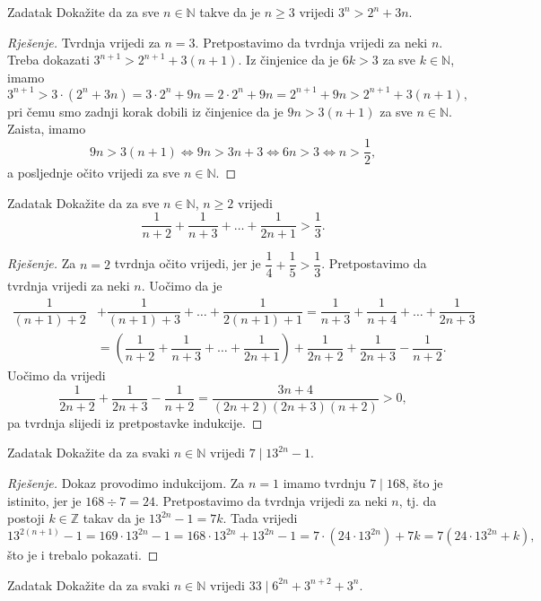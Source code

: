 \begin{exercise}{Zadatak}
Dokažite da za sve \(n\in \mathbb{N}\) takve da je \(n\geq 3\) vrijedi \(3^n>2^n+3n\).
\end{exercise}
\begin{proof}[Rješenje]
Tvrdnja vrijedi za \(n=3\). Pretpostavimo da tvrdnja vrijedi za neki \(n\). Treba dokazati \(3^{n+1}>2^{n+1}+3(n+1)\). Iz činjenice da je \(6k>3\) za sve \(k\in \mathbb{N}\), imamo
\[3^{n+1}>3\cdot (2^n+3n)=3\cdot 2^n+9n=2\cdot 2^n+9n=2^{n+1}+9n>2^{n+1}+3(n+1),\]
pri čemu smo zadnji korak dobili iz činjenice da je \(9n>3(n+1)\) za sve \(n\in \mathbb{N}\). Zaista, imamo
\[9n>3(n+1)\Leftrightarrow 9n>3n+3 \Leftrightarrow 6n>3 \Leftrightarrow n>\dfrac{1}{2},\]
a posljednje očito vrijedi za sve \(n\in \mathbb{N}\).
\end{proof}
\begin{exercise}{Zadatak}
Dokažite da za sve $n\in \mathbb{N}$, $n\geq 2$ vrijedi
$$\dfrac{1}{n+2}+\dfrac{1}{n+3}+\dots+\dfrac{1}{2n+1}>\dfrac{1}{3}.$$
\end{exercise}
\begin{proof}[Rješenje]
Za $n=2$ tvrdnja očito vrijedi, jer je $\dfrac{1}{4}+\dfrac{1}{5}>\dfrac{1}{3}$. Pretpostavimo da tvrdnja vrijedi za neki $n$. Uočimo da je
\begin{align*}
\dfrac{1}{(n+1)+2}&+\dfrac{1}{(n+1)+3}+\dots+\dfrac{1}{2(n+1)+1}=\dfrac{1}{n+3}+\dfrac{1}{n+4}+\dots+\dfrac{1}{2n+3}\\
&=\left(\dfrac{1}{n+2}+\dfrac{1}{n+3}+\dots+\dfrac{1}{2n+1}\right)+\dfrac{1}{2n+2}+\dfrac{1}{2n+3}-\dfrac{1}{n+2}.
\end{align*}
Uočimo da vrijedi
$$\dfrac{1}{2n+2}+\dfrac{1}{2n+3}-\dfrac{1}{n+2}=\dfrac{3n+4}{(2n+2)(2n+3)(n+2)}>0,$$
pa tvrdnja slijedi iz pretpostavke indukcije.
\end{proof}
\begin{exercise}{Zadatak}
Dokažite da za svaki \(n\in \mathbb{N}\) vrijedi \(7 \; |\; 13^{2n}-1\).
\end{exercise}
\begin{proof}[Rješenje]
Dokaz provodimo indukcijom. Za \(n=1\) imamo tvrdnju \(7 \; |\; 168\), što je istinito, jer je \(168 \div 7=24\). Pretpostavimo da tvrdnja vrijedi za neki \(n\), tj. da postoji \(k\in \mathbb{Z}\) takav da je \(13^{2n}-1=7k\). Tada vrijedi
\[13^{2(n+1)}-1=169\cdot 13^{2n}-1=168\cdot 13^{2n}+13^{2n}-1=7\cdot (24\cdot 13^{2n})+7k=7(24\cdot 13^{2n}+k),\]
što je i trebalo pokazati.
\end{proof}
\begin{exercise}{Zadatak}
Dokažite da za svaki \(n\in \mathbb{N}\) vrijedi \(33\; |\; 6^{2n}+3^{n+2}+3^n\).
\end{exercise}
